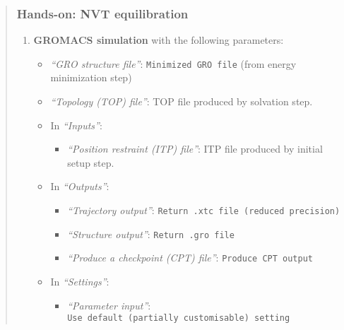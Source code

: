 \documentclass[twocolumn]{bmcart}%
\providecommand{\tightlist}{%
  \setlength{\itemsep}{0pt}\setlength{\parskip}{0pt}}
\providecommand{\tightlist}{%
  \setlength{\itemsep}{0pt}\setlength{\parskip}{0pt}}
\begin{document}
\begin{quote}
\subsubsection{Hands-on: NVT
equilibration}\label{hands-on-nvt-equilibration}

\begin{enumerate}
\def\labelenumi{\arabic{enumi}.}
\tightlist
\item
  \textbf{GROMACS simulation} with the following parameters:

  \begin{itemize}
  \tightlist
  \item
    \emph{``GRO structure file''}: \texttt{Minimized\ GRO\ file} (from
    energy minimization step)
  \item
    \emph{``Topology (TOP) file''}: TOP file produced by solvation step.
  \item
    In \emph{``Inputs''}:

    \begin{itemize}
    \tightlist
    \item
      \emph{``Position restraint (ITP) file''}: ITP file produced by
      initial setup step.
    \end{itemize}
  \item
    In \emph{``Outputs''}:

    \begin{itemize}
    \tightlist
    \item
      \emph{``Trajectory output''}:
      \texttt{Return\ .xtc\ file\ (reduced\ precision)}
    \item
      \emph{``Structure output''}: \texttt{Return\ .gro\ file}
    \item
      \emph{``Produce a checkpoint (CPT) file''}:
      \texttt{Produce\ CPT\ output}
    \end{itemize}
  \item
    In \emph{``Settings''}:

    \begin{itemize}
    \tightlist
    \item
      \emph{``Parameter input''}:
      \texttt{Use\ default\ (partially\ customisable)\ setting}


\end{itemize}
\end{itemize}
\end{enumerate}
\end{quote}
\end{document}
